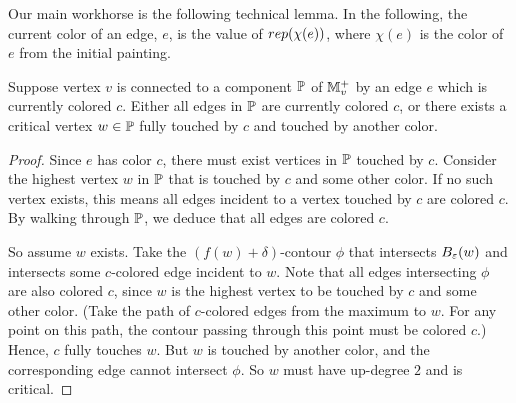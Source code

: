 
Our main workhorse is the following technical lemma. In the following, the current color of an edge, $e$, is the value of $rep(\chi(e))$, 
where $\chi(e)$ is the color of $e$ from the initial painting.


\begin{lemma} \label{lem:full} Suppose vertex $v$ is connected to a component $\mathbb{P}$ of $\mathbb{M}^+_v$
by an edge $e$ which is currently colored $c$. Either all edges in $\mathbb{P}$ are currently colored $c$, or there
exists a critical vertex $w \in \mathbb{P}$ fully touched by $c$ and touched by another color.
\end{lemma}

\begin{proof} Since $e$ has color $c$,
there must exist vertices in $\mathbb{P}$ touched by $c$. Consider the highest
vertex $w$ in $\mathbb{P}$ that is touched by $c$ and some other color. If no such vertex exists,
this means all edges incident to a vertex touched by $c$ are colored $c$. By walking through
$\mathbb{P}$, we deduce that all edges are colored $c$. 

So assume $w$ exists. Take the $(f(w)+\delta)$-contour $\phi$ that intersects $B_\varepsilon(w)$
and intersects some $c$-colored edge incident to $w$. Note that all edges intersecting $\phi$ are also colored $c$,
since $w$ is the highest vertex to be touched by $c$ and some other color. (Take the path of $c$-colored
edges from the maximum to $w$. For any point on this path, the contour passing through this point must
be colored $c$.) Hence, $c$ fully touches $w$. 
But $w$ is touched by another color, and the corresponding edge cannot intersect $\phi$. So $w$
must have up-degree $2$ and is critical.
\end{proof}

